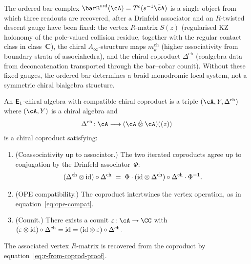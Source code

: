 The ordered bar complex $\barB^{\mathrm{ord}}(\cA) = T^c(s^{-1}\bar\cA)$
is a single object from which three readouts are recovered, after a
Drinfeld associator and an $R$-twisted descent gauge have been fixed: the
vertex $R$-matrix $S(z)$ (regularised KZ holonomy of the pole-valued
collision residue, together with the regular contact class in
class~$\mathbf{C}$), the chiral $A_\infty$-structure maps
$m_k^{\mathrm{ch}}$ (higher associativity from boundary strata of
associahedra), and the chiral coproduct $\Delta^{\mathrm{ch}}$
(coalgebra data from deconcatenation transported through the
bar--cobar counit). Without these fixed gauges, the ordered bar
determines a braid-monodromic local system, not a symmetric chiral
bialgebra structure.

\begin{definition}
\label{def:chiral-coproduct}
An $\mathsf{E}_1$-chiral algebra with compatible chiral coproduct
is a triple $(\cA, Y, \Delta^{\mathrm{ch}})$ where
$(\cA, Y)$ is a chiral algebra and
\[
 \Delta^{\mathrm{ch}} \colon
 \cA \longrightarrow
 (\cA \mathbin{\hat\otimes} \cA)((z))
\]
is a chiral coproduct satisfying:
\begin{enumerate}[label=\textup{(\roman*)}]
\item \textup{(Coassociativity up to associator.)}
 The two iterated coproducts agree up to conjugation by
 the Drinfeld associator~$\Phi$:
 \[
 (\Delta^{\mathrm{ch}} \otimes \mathrm{id})
 \circ \Delta^{\mathrm{ch}}
 \;=\;
 \Phi \cdot
 (\mathrm{id} \otimes \Delta^{\mathrm{ch}})
 \circ \Delta^{\mathrm{ch}}
 \cdot \Phi^{-1}.
 \]
\item \textup{(OPE compatibility.)}
 The coproduct intertwines the vertex operation,
 as in equation~\eqref{eq:ope-compat}.
\item \textup{(Counit.)}
 There exists a counit
 $\varepsilon \colon \cA \to \CC$ with
 $(\varepsilon \otimes \mathrm{id}) \circ \Delta^{\mathrm{ch}}
 = \mathrm{id} = (\mathrm{id} \otimes \varepsilon) \circ
 \Delta^{\mathrm{ch}}$.
\end{enumerate}
The associated vertex $R$-matrix is recovered from the coproduct by
equation~\eqref{eq:r-from-coprod-proof}.
\end{definition}

